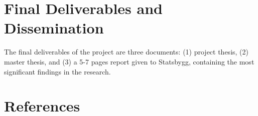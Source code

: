 \section*{Final Deliverables and Dissemination}

The final deliverables of the project are three documents: (1) project thesis, (2) master thesis, and (3) a 5-7 pages report given to Statsbygg, containing the most significant findings in the research. 

\section*{References}
\renewcommand{\bibsection}{ }









